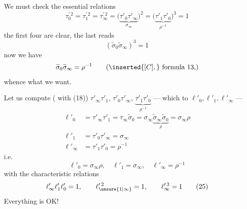 We must check the essential relations
\[
\tau_0^{\prime\,2}=\tau_1^{\prime\,2}=\tau_\infty^{\prime\,2}
=\bigl(\underbrace{\tau'_0\tau'_\infty}_{\sigma_\infty}\bigr)^2
=\bigl(\underbrace{\tau'_1\tau'_0}_{\rho^{-1}}\bigr)^3=1
\tag{23}
\]
the first four are clear, the last reads
\[
(\widetilde{\sigma}_0\widetilde{\sigma}_\infty)^3=1
\]
now we have
\[
\widetilde{\sigma}_0\widetilde{\sigma}_\infty=\rho^{-1}
\qquad (\inserted{[C],}\ \text{formula 13,})
\]
whence what we want.

Let us compute ( with (18)) $\tau'_\infty\tau'_1$, $\tau'_0\tau'_\infty$, $\underbrace{\tau'_1\tau'_0}_{\rho^{-1}}$ --- which  to $\ell'_0,\ell'_1,\ell'_\infty$ ---
\[
\begin{aligned}
\ell'_0&=\tau'_\infty\tau'_1=\tau_\infty\widetilde{\sigma}_0
=\sigma_\infty\underbrace{\widetilde{\sigma}_\infty\widetilde{\sigma}_0}_{\rho}
=\sigma_\infty\rho\\
\ell'_1&=\tau'_0\tau'_\infty=\sigma_\infty\\
\ell'_\infty&=\tau'_1\tau'_0=\rho^{-1}
\end{aligned}
\]
i.e.
\[
\ell'_0=\sigma_\infty\rho,\quad \ell'_1=\sigma_\infty,\quad \ell'_\infty=\rho^{-1}
\tag{24}
\]
with the characteristic relations
\[
\ell'_\infty\ell'_1\ell'_0=1,\qquad \ell_{\unsure{1|\infty}}^{\prime\,2}=1,\qquad \ell_\infty^{\prime\,3}=1
\tag{25}
\]
Everything is OK!

